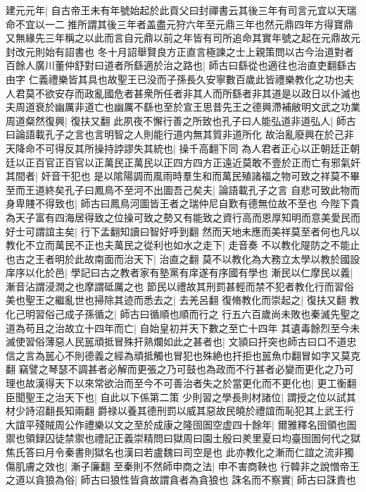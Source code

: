 建元元年|{
	自古帝王未有年號始起於此貢父曰封禪書云其後三年有司言元宜以天瑞命不宜以一二推所謂其後三年者盖盡元狩六年至元鼎三年也然元鼎四年方得寶鼎又無緣先三年稱之以此而言自元鼎以前之年皆有司所追命其實年號之起在元鼎故元封改元則始有詔書也}
冬十月詔舉賢良方正直言極諫之士上親策問以古今治道對者百餘人廣川董仲舒對曰道者所繇適於治之路也|{
	師古曰繇從也適往也治直吏翻繇古由字}
仁義禮樂皆其具也故聖王已没而子孫長久安寧數百歲此皆禮樂教化之功也夫人君莫不欲安存而政亂國危者甚衆所任者非其人而所繇者非其道是以政日以仆滅也夫周道衰於幽厲非道亡也幽厲不繇也至於宣王思昔先王之德興滯補敝明文武之功業周道粲然復興|{
	復扶又翻}
此夙夜不懈行善之所致也孔子曰人能弘道非道弘人|{
	師古曰論語載孔子之言也言明智之人則能行道内無其質非道所化}
故治亂廢興在於己非天降命不可得反其所操持誖謬失其統也|{
	操千高翻下同}
為人君者正心以正朝廷正朝廷以正百官正百官以正萬民正萬民以正四方四方正遠近莫敢不壹於正而亡有邪氣奸其間者|{
	奸音干犯也}
是以隂陽調而風雨時羣生和而萬民殖諸福之物可致之祥莫不畢至而王道終矣孔子曰鳳鳥不至河不出圖吾己矣夫|{
	論語載孔子之言}
自悲可致此物而身卑賤不得致也|{
	師古曰鳳鳥河圖皆王者之瑞仲尼自歎有德無位故不至也}
今陛下貴為天子富有四海居得致之位操可致之勢又有能致之資行高而恩厚知明而意美愛民而好士可謂誼主矣|{
	行下孟翻知讀曰智好呼到翻}
然而天地未應而美祥莫至者何也凡以教化不立而萬民不正也夫萬民之從利也如水之走下|{
	走音奏}
不以教化隄防之不能止也古之王者明於此故南面而治天下|{
	治直之翻}
莫不以教化為大務立太學以教於國設庠序以化於邑|{
	學記曰古之教者家有塾黨有庠遂有序國有學也}
漸民以仁摩民以義|{
	漸音沾謂浸潤之也摩謂砥厲之也}
節民以禮故其刑罰甚輕而禁不犯者教化行而習俗美也聖王之繼亂世也掃除其迹而悉去之|{
	去羌呂翻}
復脩教化而崇起之|{
	復扶又翻}
教化己明習俗己成子孫循之|{
	師古曰循順也順而行之}
行五六百歲尚未敗也秦滅先聖之道為苟且之治故立十四年而亡|{
	自始皇初并天下數之至亡十四年}
其遺毒餘烈至今未滅使習俗薄惡人民嚚頑抵冒殊扞熟爛如此之甚者也|{
	文頴曰扞突也師古曰口不道忠信之言為嚚心不則德義之經為頑抵觸也冒犯也殊絶也扞拒也嚚魚巾翻冒如字又莫克翻}
竊譬之琴瑟不調甚者必解而更張之乃可鼓也為政而不行甚者必變而更化之乃可理也故漢得天下以來常欲治而至今不可善治者失之於當更化而不更化也|{
	更工衡翻}
臣聞聖王之治天下也|{
	自此以下係第二策}
少則習之學長則材諸位|{
	謂授之位以試其材少詩沼翻長知兩翻}
爵禄以養其德刑罰以威其惡故民曉於禮誼而恥犯其上武王行大誼平殘賊周公作禮樂以文之至於成康之隆囹圄空虚四十餘年|{
	爾雅釋名囹領也圄禦也領録囚徒禁禦也禮記正義崇精問曰獄周曰園土殷曰羑里夏曰均臺囹圄何代之獄焦氏答曰月令秦書則獄名也漢曰若盧魏曰司空是也}
此亦教化之漸而仁誼之流非獨傷肌膚之效也|{
	漸子廉翻}
至秦則不然師申商之法|{
	申不害商鞅也}
行韓非之說憎帝王之道以貪狼為俗|{
	師古曰狼性皆貪故謂貪者為貪狼也}
誅名而不察實|{
	師古曰誅責也}
